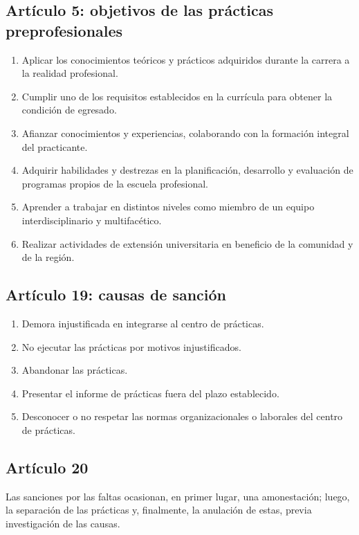 \documentclass[12pt,a4paper]{article}
\begin{document}
\subsection*{Artículo 5: objetivos de las prácticas preprofesionales}
\begin{enumerate}[label=\Alph*.]
  \item Aplicar los conocimientos teóricos y prácticos adquiridos durante la carrera a la realidad profesional.
  \item Cumplir uno de los requisitos establecidos en la currícula para obtener la condición de egresado.
  \item Afianzar conocimientos y experiencias, colaborando con la formación integral del practicante.
  \item Adquirir habilidades y destrezas en la planificación, desarrollo y evaluación de programas propios de la escuela profesional.
  \item Aprender a trabajar en distintos niveles como miembro de un equipo interdisciplinario y multifacético.
  \item Realizar actividades de extensión universitaria en beneficio de la comunidad y de la región.
\end{enumerate}

\subsection*{Artículo 19: causas de sanción}
\begin{enumerate}
  \item Demora injustificada en integrarse al centro de prácticas.
  \item No ejecutar las prácticas por motivos injustificados.
  \item Abandonar las prácticas.
  \item Presentar el informe de prácticas fuera del plazo establecido.
  \item Desconocer o no respetar las normas organizacionales o laborales del centro de prácticas.
\end{enumerate}

\subsection*{Artículo 20}
Las sanciones por las faltas ocasionan, en primer lugar, una amonestación; luego, la separación de las prácticas y, finalmente, la anulación de estas, previa investigación de las causas.
\end{document}
